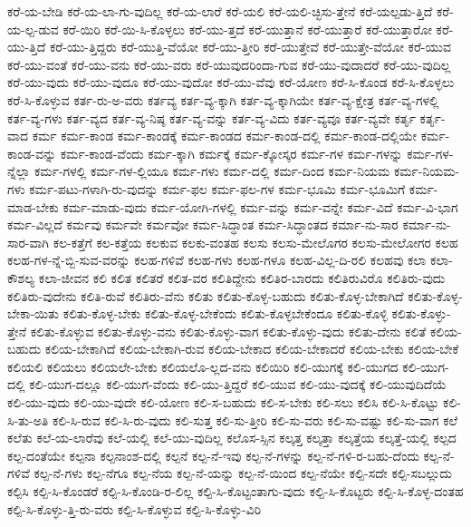 {ಕರೆ-ಯ-ಬೇಡಿ
ಕರೆ-ಯ-ಲಾ-ಗು-ವುದಿಲ್ಲ
ಕರೆ-ಯ-ಲಾರೆ
ಕರೆ-ಯಲಿ
ಕರೆ-ಯಲಿ-ಚ್ಛಿಸು-ತ್ತೇನೆ
ಕರೆ-ಯಲ್ಪಡು-ತ್ತಿದೆ
ಕರೆ-ಯ-ಲ್ಪ-ಡುವ
ಕರೆ-ಯಿರಿ
ಕರೆ-ಯಿ-ಸಿ-ಕೊಳ್ಳಲು
ಕರೆ-ಯು-ತ್ತದೆ
ಕರೆ-ಯುತ್ತಾನೆ
ಕರೆ-ಯುತ್ತಾರೆ
ಕರೆ-ಯುತ್ತಾರೋ
ಕರೆ-ಯು-ತ್ತಿದೆ
ಕರೆ-ಯು-ತ್ತಿದ್ದರು
ಕರೆ-ಯುತ್ತಿ-ವೆಯೋ
ಕರೆ-ಯು-ತ್ತೀರಿ
ಕರೆ-ಯುತ್ತೇವೆ
ಕರೆ-ಯುತ್ತೇ-ವೆಯೋ
ಕರೆ-ಯುವ
ಕರೆ-ಯು-ವಂತೆ
ಕರೆ-ಯು-ವನು
ಕರೆ-ಯು-ವರು
ಕರೆ-ಯುವುದರಿಂದಾ-ಗುವ
ಕರೆ-ಯು-ವುದಾದರೆ
ಕರೆ-ಯು-ವುದಿಲ್ಲ
ಕರೆ-ಯು-ವುದು
ಕರೆ-ಯು-ವುದೂ
ಕರೆ-ಯು-ವುದೋ
ಕರೆ-ಯು-ವೆವು
ಕರೆ-ಯೋಣ
ಕರೆ-ಸಿ-ಕೊಂಡ
ಕರೆ-ಸಿ-ಕೊಳ್ಳಲು
ಕರೆ-ಸಿ-ಕೊಳ್ಳುವ
ಕರ್ತ-ರು-ಅ-ವರು
ಕರ್ತವ್ಯ
ಕರ್ತ-ವ್ಯ-ಕ್ಕಾಗಿ
ಕರ್ತ-ವ್ಯ-ಕ್ಕಾಗಿಯೇ
ಕರ್ತ-ವ್ಯ-ಕ್ಷೇತ್ರ
ಕರ್ತ-ವ್ಯ-ಗಳಲ್ಲಿ
ಕರ್ತ-ವ್ಯ-ಗಳು
ಕರ್ತ-ವ್ಯದ
ಕರ್ತ-ವ್ಯ-ನಿಷ್ಠ
ಕರ್ತ-ವ್ಯ-ವನ್ನು
ಕರ್ತ-ವ್ಯ-ವಿದು
ಕರ್ತ-ವ್ಯವೂ
ಕರ್ತ-ವ್ಯವೇ
ಕರ್ತೃ
ಕರ್ತೃ-ವಾದ
ಕರ್ಮ
ಕರ್ಮ-ಕಾಂಡ
ಕರ್ಮ-ಕಾಂಡಕ್ಕೆ
ಕರ್ಮ-ಕಾಂಡದ
ಕರ್ಮ-ಕಾಂಡ-ದಲ್ಲಿ
ಕರ್ಮ-ಕಾಂಡ-ದಲ್ಲಿಯೇ
ಕರ್ಮ-ಕಾಂಡ-ವನ್ನು
ಕರ್ಮ-ಕಾಂಡ-ವೆಂದು
ಕರ್ಮ-ಕ್ಕಾಗಿ
ಕರ್ಮಕ್ಕೆ
ಕರ್ಮ-ಕ್ಕೋಸ್ಕರ
ಕರ್ಮ-ಗಳ
ಕರ್ಮ-ಗಳನ್ನು
ಕರ್ಮ-ಗಳ-ನ್ನೆಲ್ಲಾ
ಕರ್ಮ-ಗಳಲ್ಲಿ
ಕರ್ಮ-ಗಳ-ಲ್ಲಿಯೂ
ಕರ್ಮ-ಗಳು
ಕರ್ಮ-ದಲ್ಲಿ
ಕರ್ಮ-ದಿಂದ
ಕರ್ಮ-ನಿಯಮ
ಕರ್ಮ-ನಿಯಮ-ಗಳು
ಕರ್ಮ-ಪಟು-ಗಳಾಗಿ-ರು-ವುದನ್ನು
ಕರ್ಮ-ಫಲ
ಕರ್ಮ-ಫಲ-ಗಳ
ಕರ್ಮ-ಭೂಮಿ
ಕರ್ಮ-ಭೂಮಿಗೆ
ಕರ್ಮ-ಮಾಡ-ಬೇಕು
ಕರ್ಮ-ಮಾಡು-ವುದು
ಕರ್ಮ-ಯೋಗಿ-ಗಳಲ್ಲಿ
ಕರ್ಮ-ವನ್ನು
ಕರ್ಮ-ವನ್ನೇ
ಕರ್ಮ-ವಿದೆ
ಕರ್ಮ-ವಿ-ಭಾಗ
ಕರ್ಮ-ವಿಲ್ಲದೆ
ಕರ್ಮವು
ಕರ್ಮವೇ
ಕರ್ಮವೋ
ಕರ್ಮ-ಸಿದ್ಧಾಂತ
ಕರ್ಮ-ಸಿದ್ಧಾಂತದ
ಕರ್ಮಾ-ನು-ಸಾರ
ಕರ್ಮಾ-ನು-ಸಾರ-ವಾಗಿ
ಕಲ-ಕತ್ತೆಗೆ
ಕಲ-ಕತ್ತೆಯ
ಕಲಕುವ
ಕಲಕು-ವಂತಹ
ಕಲಸು
ಕಲಸು-ಮೇಲೊಗರ
ಕಲಸು-ಮೇಲೋಗರ
ಕಲಹ
ಕಲಹ-ಗಳ-ನ್ನೆ-ಬ್ಬಿ-ಸುವ-ವರನ್ನು
ಕಲಹ-ಗಳಿವೆ
ಕಲಹ-ಗಳು
ಕಲಹ-ಗಳೂ
ಕಲಹ-ವಿಲ್ಲ-ದಿ-ರಲಿ
ಕಲಹವು
ಕಲಾ
ಕಲಾ-ಕೌಶಲ್ಯ
ಕಲಾ-ಜೀವನ
ಕಲಿ
ಕಲಿತ
ಕಲಿತರೆ
ಕಲಿತ-ವರ
ಕಲಿತಿದ್ದೇನು
ಕಲಿತಿರ-ಬಾರದು
ಕಲಿತಿರುವಿರೊ
ಕಲಿತಿರು-ವುದು
ಕಲಿತಿರು-ವುದೇನು
ಕಲಿತಿ-ರುವೆ
ಕಲಿತಿರು-ವೆನು
ಕಲಿತು
ಕಲಿತು-ಕೊಳ್ಳ-ಬಹುದು
ಕಲಿತು-ಕೊಳ್ಳ-ಬೇಕಾಗಿದೆ
ಕಲಿತು-ಕೊಳ್ಳ-ಬೇಕಾ-ಯಿತು
ಕಲಿತು-ಕೊಳ್ಳ-ಬೇಕು
ಕಲಿತು-ಕೊಳ್ಳ-ಬೇಕೆಂದು
ಕಲಿತು-ಕೊಳ್ಳಬೇಕೆಂದೂ
ಕಲಿತು-ಕೊಳ್ಳಿ
ಕಲಿತು-ಕೊಳ್ಳು-ತ್ತೇನೆ
ಕಲಿತು-ಕೊಳ್ಳುವ
ಕಲಿತು-ಕೊಳ್ಳು-ವನು
ಕಲಿತು-ಕೊಳ್ಳು-ವಾಗ
ಕಲಿತು-ಕೊಳ್ಳು-ವುದು
ಕಲಿತು-ದೇನು
ಕಲಿತೆ
ಕಲಿಯ-ಬಹುದು
ಕಲಿಯ-ಬೇಕಾಗಿದೆ
ಕಲಿಯ-ಬೇಕಾಗಿ-ರುವ
ಕಲಿಯ-ಬೇಕಾದ
ಕಲಿಯ-ಬೇಕಾದರೆ
ಕಲಿಯ-ಬೇಕು
ಕಲಿಯ-ಬೇಕೆ
ಕಲಿಯಲಿ
ಕಲಿಯಲು
ಕಲಿಯಲೇ-ಬೇಕು
ಕಲಿಯಲೊ-ಲ್ಲದ-ವನು
ಕಲಿಯಿರಿ
ಕಲಿ-ಯುಗಕ್ಕೆ
ಕಲಿ-ಯುಗದ
ಕಲಿ-ಯುಗ-ದಲ್ಲಿ
ಕಲಿ-ಯುಗ-ದಲ್ಲೂ
ಕಲಿ-ಯುಗ-ವೆಂದು
ಕಲಿ-ಯು-ತ್ತಿದ್ದರೆ
ಕಲಿ-ಯುವ
ಕಲಿ-ಯು-ವುದಕ್ಕೆ
ಕಲಿ-ಯುವುದಿದೆಯೆ
ಕಲಿ-ಯು-ವುದು
ಕಲಿ-ಯು-ವುದೇ
ಕಲಿ-ಯೋಣ
ಕಲಿ-ಸ-ಬಹುದು
ಕಲಿ-ಸ-ಬೇಕು
ಕಲಿ-ಸಲು
ಕಲಿಸಿ
ಕಲಿ-ಸಿ-ಕೊಟ್ಟು
ಕಲಿ-ಸಿ-ತು-ಅತಿ
ಕಲಿ-ಸಿ-ರುವ
ಕಲಿ-ಸಿ-ರು-ವುದು
ಕಲಿ-ಸುತ್ತ
ಕಲಿ-ಸು-ತ್ತೀರಿ
ಕಲಿ-ಸು-ವರು
ಕಲಿ-ಸು-ವಷ್ಟು
ಕಲಿ-ಸು-ವಾಗ
ಕಲೆ
ಕಲೆತು
ಕಲೆ-ಯ-ಲಾರೆವು
ಕಲೆ-ಯಲ್ಲಿ
ಕಲೆ-ಯು-ವುದಿಲ್ಲ
ಕಲೊಸ-ಸ್ಸಿನ
ಕಲ್ಕತ್ತ
ಕಲ್ಕತ್ತಾ
ಕಲ್ಕತ್ತೆಯ
ಕಲ್ಕತ್ತೆ-ಯಲ್ಲಿ
ಕಲ್ಪದ
ಕಲ್ಪ-ದಂತೆಯೇ
ಕಲ್ಪನಾ
ಕಲ್ಪನಾಂಶ-ದಲ್ಲಿ
ಕಲ್ಪನೆ
ಕಲ್ಪ-ನೆ-ಇವು
ಕಲ್ಪ-ನೆ-ಗಳನ್ನು
ಕಲ್ಪ-ನೆ-ಗಳಿ-ರ-ಬಹು-ದೆಂದು
ಕಲ್ಪ-ನೆ-ಗಳಿವೆ
ಕಲ್ಪ-ನೆ-ಗಳು
ಕಲ್ಪ-ನೆಗೂ
ಕಲ್ಪ-ನೆಯ
ಕಲ್ಪ-ನೆ-ಯನ್ನು
ಕಲ್ಪ-ನೆ-ಯಿಂದ
ಕಲ್ಪ-ನೆಯೇ
ಕಲ್ಪಿ-ಸದೇ
ಕಲ್ಪಿ-ಸಬಲ್ಲುದು
ಕಲ್ಪಿಸಿ
ಕಲ್ಪಿ-ಸಿ-ಕೊಂಡರೆ
ಕಲ್ಪಿ-ಸಿ-ಕೊಂಡಿ-ರ-ಲಿಲ್ಲ
ಕಲ್ಪಿ-ಸಿ-ಕೊಟ್ಟಂತಾಗು-ವುದು
ಕಲ್ಪಿ-ಸಿ-ಕೊಟ್ಟರು
ಕಲ್ಪಿ-ಸಿ-ಕೊಳ್ಳ-ದಂತಹ
ಕಲ್ಪಿ-ಸಿ-ಕೊಳ್ಳು-ತ್ತಿ-ರು-ವರು
ಕಲ್ಪಿ-ಸಿ-ಕೊಳ್ಳುವ
ಕಲ್ಪಿ-ಸಿ-ಕೊಳ್ಳು-ವಿರಿ
}

